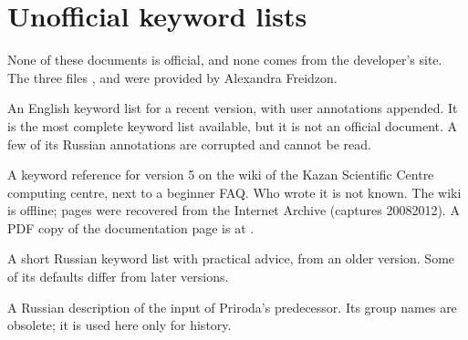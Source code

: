 \documentclass[letterpaper,10pt,english,openany,oneside]{sphinxmanual}
\begin{document}
\section{Unofficial keyword lists}
\label{\detokenize{sources:unofficial-keyword-lists}}
\sphinxAtStartPar
None of these documents is official, and none comes from the developer’s site. The three files ,
 and  were provided by Alexandra Freidzon.
\begin{description}
\sphinxAtStartPar
An English keyword list for a recent version, with user annotations appended. It is the most complete keyword list
available, but it is not an official document. A few of its Russian annotations are corrupted and cannot be read.

\sphinxAtStartPar
A keyword reference for version 5 on the wiki of the Kazan Scientific Centre computing centre, next to a beginner
FAQ. Who wrote it is not known. The wiki is offline; pages were
recovered from the Internet Archive (captures 2008\textendash{}2012). A PDF copy of the documentation page is at
.

\sphinxAtStartPar
A short Russian keyword list with practical advice, from an older version. Some of its defaults differ from later
versions.

\sphinxAtStartPar
A Russian description of the input of Priroda’s predecessor. Its group names are obsolete; it is used here only
for history.

\end{description}
\end{document}
